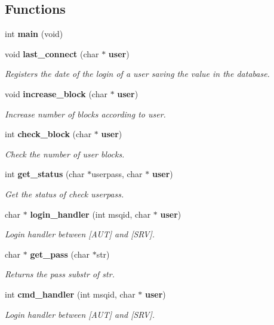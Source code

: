 \subsection*{Functions}
\begin{DoxyCompactItemize}
\item 
int \textbf{ main} (void)
\item 
void \textbf{ last\+\_\+connect} (char $\ast$\textbf{ user})
\begin{DoxyCompactList}\small\item\em Registers the date of the login of a user saving the value in the database. \end{DoxyCompactList}\item 
void \textbf{ increase\+\_\+block} (char $\ast$\textbf{ user})
\begin{DoxyCompactList}\small\item\em Increase number of blocks according to user. \end{DoxyCompactList}\item 
int \textbf{ check\+\_\+block} (char $\ast$\textbf{ user})
\begin{DoxyCompactList}\small\item\em Check the number of user blocks. \end{DoxyCompactList}\item 
int \textbf{ get\+\_\+status} (char $\ast$userpass, char $\ast$\textbf{ user})
\begin{DoxyCompactList}\small\item\em Get the status of check userpass. \end{DoxyCompactList}\item 
char $\ast$ \textbf{ login\+\_\+handler} (int msqid, char $\ast$\textbf{ user})
\begin{DoxyCompactList}\small\item\em Login handler between [A\+UT] and [S\+RV]. \end{DoxyCompactList}\item 
char $\ast$ \textbf{ get\+\_\+pass} (char $\ast$str)
\begin{DoxyCompactList}\small\item\em Returns the pass substr of str. \end{DoxyCompactList}\item 
int \textbf{ cmd\+\_\+handler} (int msqid, char $\ast$\textbf{ user})
\begin{DoxyCompactList}\small\item\em Login handler between [A\+UT] and [S\+RV]. \end{DoxyCompactList}\item 

\end{DoxyCompactItemize}
